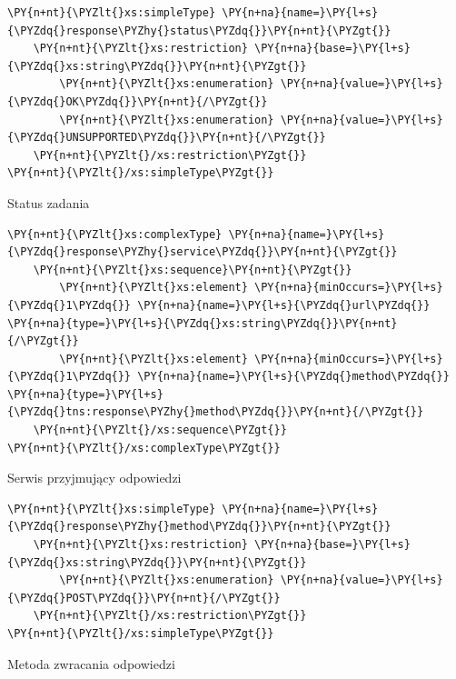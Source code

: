 \begin{program}
\begin{code}
\begin{Verbatim}[commandchars=\\\{\}]
\PY{n+nt}{\PYZlt{}xs:simpleType} \PY{n+na}{name=}\PY{l+s}{\PYZdq{}response\PYZhy{}status\PYZdq{}}\PY{n+nt}{\PYZgt{}}
	\PY{n+nt}{\PYZlt{}xs:restriction} \PY{n+na}{base=}\PY{l+s}{\PYZdq{}xs:string\PYZdq{}}\PY{n+nt}{\PYZgt{}}
		\PY{n+nt}{\PYZlt{}xs:enumeration} \PY{n+na}{value=}\PY{l+s}{\PYZdq{}OK\PYZdq{}}\PY{n+nt}{/\PYZgt{}}
		\PY{n+nt}{\PYZlt{}xs:enumeration} \PY{n+na}{value=}\PY{l+s}{\PYZdq{}UNSUPPORTED\PYZdq{}}\PY{n+nt}{/\PYZgt{}}
	\PY{n+nt}{\PYZlt{}/xs:restriction\PYZgt{}}
\PY{n+nt}{\PYZlt{}/xs:simpleType\PYZgt{}}
\end{Verbatim}
\end{code}
\caption{Status zadania}
\end{program}

\begin{program}
\begin{code}
\begin{Verbatim}[commandchars=\\\{\}]
\PY{n+nt}{\PYZlt{}xs:complexType} \PY{n+na}{name=}\PY{l+s}{\PYZdq{}response\PYZhy{}service\PYZdq{}}\PY{n+nt}{\PYZgt{}}
	\PY{n+nt}{\PYZlt{}xs:sequence}\PY{n+nt}{\PYZgt{}}
		\PY{n+nt}{\PYZlt{}xs:element} \PY{n+na}{minOccurs=}\PY{l+s}{\PYZdq{}1\PYZdq{}} \PY{n+na}{name=}\PY{l+s}{\PYZdq{}url\PYZdq{}} \PY{n+na}{type=}\PY{l+s}{\PYZdq{}xs:string\PYZdq{}}\PY{n+nt}{/\PYZgt{}}
		\PY{n+nt}{\PYZlt{}xs:element} \PY{n+na}{minOccurs=}\PY{l+s}{\PYZdq{}1\PYZdq{}} \PY{n+na}{name=}\PY{l+s}{\PYZdq{}method\PYZdq{}} \PY{n+na}{type=}\PY{l+s}{\PYZdq{}tns:response\PYZhy{}method\PYZdq{}}\PY{n+nt}{/\PYZgt{}}
	\PY{n+nt}{\PYZlt{}/xs:sequence\PYZgt{}}
\PY{n+nt}{\PYZlt{}/xs:complexType\PYZgt{}}
\end{Verbatim}
\end{code}
\caption{Serwis przyjmujący odpowiedzi}
\end{program}

\begin{program}
\begin{code}
\begin{Verbatim}[commandchars=\\\{\}]
\PY{n+nt}{\PYZlt{}xs:simpleType} \PY{n+na}{name=}\PY{l+s}{\PYZdq{}response\PYZhy{}method\PYZdq{}}\PY{n+nt}{\PYZgt{}}
	\PY{n+nt}{\PYZlt{}xs:restriction} \PY{n+na}{base=}\PY{l+s}{\PYZdq{}xs:string\PYZdq{}}\PY{n+nt}{\PYZgt{}}
		\PY{n+nt}{\PYZlt{}xs:enumeration} \PY{n+na}{value=}\PY{l+s}{\PYZdq{}POST\PYZdq{}}\PY{n+nt}{/\PYZgt{}}
	\PY{n+nt}{\PYZlt{}/xs:restriction\PYZgt{}}
\PY{n+nt}{\PYZlt{}/xs:simpleType\PYZgt{}}
\end{Verbatim}
\end{code}
\caption{Metoda zwracania odpowiedzi}
\end{program}

